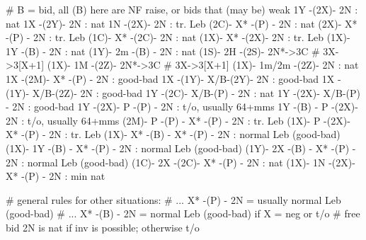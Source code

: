 # B = bid, all (B) here are NF raise, or bids that (may be) weak
 1Y -(2X)- 2N : nat
 1X -(2Y)- 2N : nat
 1N -(2X)- 2N : tr. Leb
(2C)- X* -(P) - 2N : nat
(2X)- X* -(P) - 2N : tr. Leb
(1C)- X* -(2C)- 2N : nat
(1X)- X* -(2X)- 2N : tr. Leb 
(1X)- 1Y -(B) - 2N : nat
(1Y)- 2m -(B) - 2N : nat
(1S)- 2H -(2S)- 2N*->3C # 3X->3[X+1]
(1X)- 1M -(2Z)- 2N*->3C # 3X->3[X+1]
(1X)- 1m/2m -(2Z)- 2N : nat
 1X -(2M)- X* -(P) - 2N : good-bad
 1X -(1Y)- X/B-(2Y)- 2N : good-bad
 1X -(1Y)- X/B-(2Z)- 2N : good-bad 
 1Y -(2C)- X/B-(P) - 2N : nat 
 1Y -(2X)- X/B-(P) - 2N : good-bad
 1Y -(2X)- P  -(P) - 2N : t/o, usually 64+mms
 1Y -(B) - P  -(2X)- 2N : t/o, usually 64+mms
(2M)- P  -(P) - X* -(P) - 2N : tr. Leb
(1X)- P  -(2X)- X* -(P) - 2N : tr. Leb
(1X)- X* -(B) - X* -(P) - 2N : normal Leb (good-bad)
(1X)- 1Y -(B) - X* -(P) - 2N : normal Leb (good-bad)
(1Y)- 2X -(B) - X* -(P) - 2N : normal Leb (good-bad)
(1C)- 2X -(2C)- X* -(P) - 2N : nat
(1X)- 1N -(2X)- X* -(P) - 2N : min nat

# general rules for other situations: 
# ... X* -(P) - 2N = usually normal Leb (good-bad)
# ... X* -(B) - 2N = normal Leb (good-bad) if X = neg or t/o
# free bid 2N is nat if inv is possible; otherwise t/o